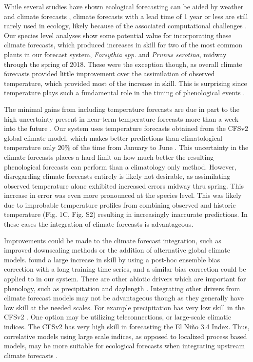 \documentclass[fleqn,10pt,lineno]{wlpeerj}
\begin{document}
While several studies have shown ecological forecasting can be aided by weather and climate forecasts \citep{carrillo2018, vandoren2018}, climate forecasts with a lead time of 1 year or less are still rarely used in ecology, likely because of the associated computational challenges \citep{taylor2020a}. Our species level analyses show some potential value for incorporating these climate forecasts, which produced increases in skill for two of the most common plants in our forecast system, \textit{Forsythia spp.} and \textit{Prunus serotina}, midway through the spring of 2018. These were the exception though, as overall climate forecasts provided little improvement over the assimilation of observed temperature, which provided most of the increase in skill. This is surprising since temperature plays such a fundamental role in the timing of phenological events \citep{chuine2017, piao2019}. 

The minimal gains from including temperature forecasts are due in part to the high uncertainty present in near-term temperature forecasts more than a week into the future \citep{dietze2017}. Our system uses temperature forecasts obtained from the CFSv2 global climate model, which makes better predictions than climatological temperature only 20\% of the time from January to June \citep{saha2014}. This uncertainty in the climate forecasts places a hard limit on how much better the resulting phenological forecasts can perform than a climatology only method. However, disregarding climate forecasts entirely is likely not desirable, as assimilating observed temperature alone exhibited increased errors midway thru spring. This increase in error was even more pronounced at the species level. This was likely due to improbable temperature profiles from combining observed and historic temperature (Fig. 1C, Fig. S2) resulting in increasingly inaccurate predictions. In these cases the integration of climate forecasts is advantageous. 

Improvements could be made to the climate forecast integration, such as improved downscaling methods or the addition of alternative global climate models. \cite{carrillo2018} found a large increase in skill by using a post-hoc ensemble bias correction with a long training time series, and a similar bias correction could be applied to in our system. There are other abiotic drivers which are important for phenology, such as precipitation and daylength \citep{diez2012}. Integrating other drivers from climate forecast models may not be advantageous though as they generally have low skill at the needed scales. For example precipitation has very low skill in the CFSv2 \citep{saha2014}. One option may be utilizing teleconnections, or large-scale climatic indices. The CFSv2 has very high skill in forecasting the El Niño 3.4 Index. Thus, correlative models using large scale indices, as opposed to localized process based models, may be more suitable for ecological forecasts when integrating upstream climate forecasts \citep{hallett2004}. 
\end{document}
